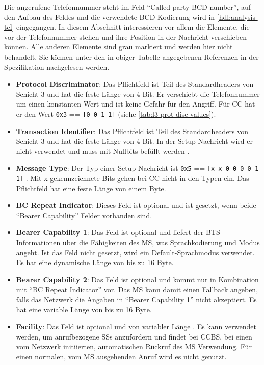 Die angerufene Telefonnummer steht im Feld "`Called party BCD number"', auf den Aufbau des Feldes und die verwendete \ac{BCD}-Kodierung wird in \autoref{hdl:analysis-tel} eingegangen. In diesem Abschnitt interessieren vor allem die Elemente, die vor der Telefonnummer stehen und ihre Position in der Nachricht verschieben können. Alle anderen Elemente sind grau markiert und werden hier nicht behandelt. Sie können unter den in obiger Tabelle angegebenen Referenzen in der  Spezifikation nachgelesen werden.

\begin{itemize}
\item \textbf{Protocol Discriminator}: Das Pflichtfeld ist Teil des Standardheaders von Schicht 3 und hat die feste Länge von 4 Bit. Er verschiebt die Telefonnummer um einen konstanten Wert und ist keine Gefahr für den Angriff. Für \ac{CC} hat er den Wert \texttt{0x3} == \texttt{[0 0 1 1]} (siehe \autoref{tab:l3-prot-disc-values}).
\item \textbf{Transaction Identifier}: Das Pflichtfeld ist Teil des Standardheaders von Schicht 3 und hat die feste Länge von 4 Bit. In der Setup-Nachricht wird er nicht verwendet und muss mit Nullbits befüllt werden \citep[Kap. 8.3.1]{3gpp:24.008}. 
\item \textbf{Message Type}: Der Typ einer Setup-Nachricht ist \texttt{0x5} == \texttt{[x x 0 0 0 0 1 1]} \citep[Tabelle 10.3 ]{3gpp:24.008}. Mit x gekennzeichnete Bits gehen bei \ac{CC} nicht in den Typen ein. Das Pflichtfeld hat eine feste Länge von einem Byte.
\item \textbf{BC Repeat Indicator}: Dieses Feld ist optional und ist gesetzt, wenn beide "`Bearer Capability"' Felder vorhanden sind.
\item \textbf{Bearer Capability 1}: Das Feld ist optional und liefert der \ac{BTS} Informationen über die Fähigkeiten des \ac{MS}, was Sprachkodierung und Modus angeht. Ist das Feld nicht gesetzt, wird ein Default-Sprachmodus verwendet. Es hat eine dynamische Länge von bis zu 16 Byte.
\item \textbf{Bearer Capability 2}: Das Feld ist optional und kommt nur in Kombination mit "`BC Repeat Indicator"' vor. Das \ac{MS} kann damit einen Fallback angeben, falls das Netzwerk die Angaben in "`Bearer Capability 1"' nicht akzeptiert. Es hat eine variable Länge von bis zu 16 Byte. 
\item \textbf{Facility}: Das Feld ist optional und von variabler Länge \citep[Kap. 3.6]{3gpp:24.080}. Es kann verwendet werden, um anrufbezogene \acp{SS} anzufordern und findet bei \ac{CCBS}, bei einen vom Netzwerk initiierten, automatischen Rückruf des \ac{MS} Verwendung. Für einen normalen, vom \ac{MS} ausgehenden Anruf wird es nicht genutzt.

\end{itemize}
